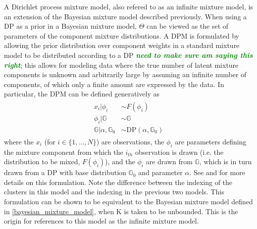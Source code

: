 \documentclass[smallcondensed, final]{svjour3}
\newcommand{\willie}[1]{\textcolor{green}{\textsf{\emph{\textbf{\textcolor{green}{#1}}}}}}
\begin{document}
A Dirichlet process mixture model, also refered to as an infinite mixture model, is an extension of the Bayesian mixture model described previously. 
When using a DP as a prior in a Bayesian mixture model, $\Theta$ can be viewed as the set of parameters of the component mixture distributions. 	A DPM is formulated by allowing the prior distribution over component weights in a standard mixture model to be distributed according to a DP \willie{need to make sure am saying this right}; this allows for modeling data where the true number of latent mixture components is unknown and arbitrarily large by assuming an infinite number of components, of which only a finite amount are expressed by the data. In particular, the DPM can be defined generatively as
\begin{align}
\begin{split}
	x_{i}|\phi_{i} &\sim F(\phi_{i}) \\
	\phi_{i} | \mathbb{G}  &\sim  \mathbb{G} \\
	\mathbb{G} | \alpha, \mathbb{G}_{0}  &\sim  \text{DP}(\alpha, \mathbb{G}_{0})
\end{split}
\end{align}
where the $x_{i}$ (for $i \in \{ 1, \ldots, N \}$) are observations, the $\phi_{i}$ are parameters defining the mixture component from which the $i_{th}$ observation is drawn (i.e. the distribution to be mixed, $F(\phi_{i})$), and the $\phi_{i}$ are drawn from $\mathbb{G}$, which is in turn drawn from a DP with base distribution $\mathbb{G}_{0}$ and parameter $\alpha$. See \cite{gasthaus_2008} and \cite{gasthaus_thesis} for more details on this formulation. Note the difference between the indexing of the clusters in this model and the indexing in the previous two models. This formulation can be shown to be equivalent to the Bayesian mixture model defined in \eqref{bayesian_mixture_model}, when K is taken to be unbounded. This is the origin for references to this model as the infinite mixture model.
\end{document}

